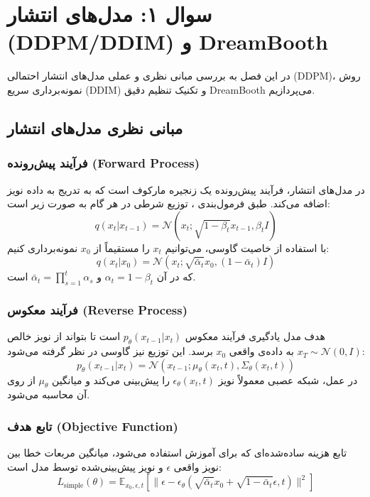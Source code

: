 \def \Subject {سوال ۱: مدل‌های انتشار (DDPM/DDIM) و DreamBooth}
\def \Session { یک}
\renewcommand{\chaptername}{سوال}
\chapter{\Subject}

در این فصل به بررسی مبانی نظری و عملی مدل‌های انتشار احتمالی (DDPM)، روش نمونه‌برداری سریع (DDIM) و تکنیک تنظیم دقیق DreamBooth می‌پردازیم.

\section{مبانی نظری مدل‌های انتشار}

\subsection{فرآیند پیش‌رونده (Forward Process)}
در مدل‌های انتشار، فرآیند پیش‌رونده یک زنجیره مارکوف است که به تدریج به داده نویز اضافه می‌کند. طبق فرمول‌بندی ، توزیع شرطی در هر گام به صورت زیر است:
\begin{equation}
q(x_t | x_{t-1}) = \mathcal{N}(x_t; \sqrt{1-\beta_t}x_{t-1}, \beta_t I)
\end{equation}
با استفاده از خاصیت گاوسی، می‌توانیم $x_t$ را مستقیماً از $x_0$ نمونه‌برداری کنیم:
\begin{equation}
q(x_t | x_0) = \mathcal{N}(x_t; \sqrt{\bar{\alpha}_t}x_0, (1-\bar{\alpha}_t)I)
\end{equation}
که در آن $\alpha_t = 1 - \beta_t$ و $\bar{\alpha}_t = \prod_{s=1}^t \alpha_s$ است.

\subsection{فرآیند معکوس (Reverse Process)}
هدف مدل یادگیری فرآیند معکوس $p_\theta(x_{t-1}|x_t)$ است تا بتواند از نویز خالص $x_T \sim \mathcal{N}(0, I)$ به داده‌ی واقعی $x_0$ برسد. این توزیع نیز گاوسی در نظر گرفته می‌شود:
\begin{equation}
p_\theta(x_{t-1}|x_t) = \mathcal{N}(x_{t-1}; \mu_\theta(x_t, t), \Sigma_\theta(x_t, t))
\end{equation}
در عمل، شبکه عصبی معمولاً نویز $\epsilon_\theta(x_t, t)$ را پیش‌بینی می‌کند و میانگین $\mu_\theta$ از روی آن محاسبه می‌شود.

\subsection{تابع هدف (Objective Function)}
تابع هزینه ساده‌شده‌ای که برای آموزش استفاده می‌شود، میانگین مربعات خطا بین نویز واقعی $\epsilon$ و نویز پیش‌بینی‌شده توسط مدل است:
\begin{equation}
L_{\text{simple}}(\theta) = \mathbb{E}_{x_0, \epsilon, t} \left[ \| \epsilon - \epsilon_\theta(\sqrt{\bar{\alpha}_t}x_0 + \sqrt{1-\bar{\alpha}_t}\epsilon, t) \|^2 \right]
\end{equation}

